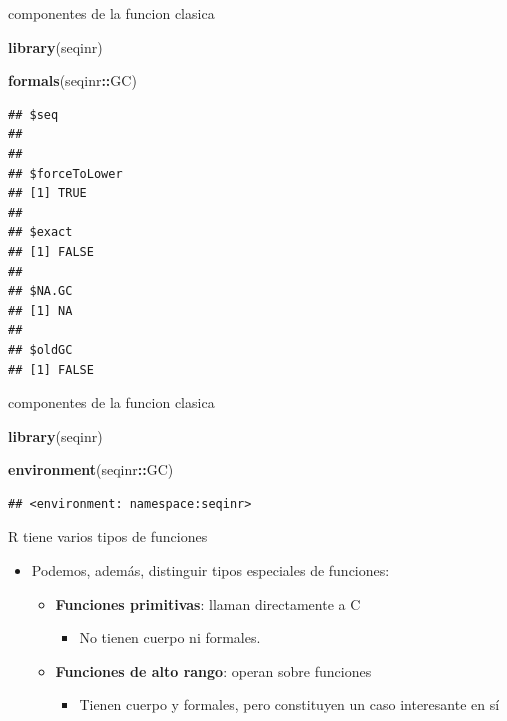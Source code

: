 \documentclass[ignorenonframetext,]{beamer}
\newenvironment{Shaded}{\begin{snugshade}}{\end{snugshade}}
\newcommand{\KeywordTok}[1]{\textcolor[rgb]{0.13,0.29,0.53}{\textbf{#1}}}
\newcommand{\NormalTok}[1]{#1}
\newcommand{\OperatorTok}[1]{\textcolor[rgb]{0.81,0.36,0.00}{\textbf{#1}}}
\providecommand{\tightlist}{%
  \setlength{\itemsep}{0pt}\setlength{\parskip}{0pt}}
\begin{document}
\begin{frame}[fragile]{componentes de la funcion clasica}
\protect\hypertarget{componentes-de-la-funcion-clasica-2}{}

\begin{Shaded}
\begin{Highlighting}[]
\KeywordTok{library}\NormalTok{(seqinr)}

\KeywordTok{formals}\NormalTok{(seqinr}\OperatorTok{::}\NormalTok{GC)}
\end{Highlighting}
\end{Shaded}

\begin{verbatim}
## $seq
## 
## 
## $forceToLower
## [1] TRUE
## 
## $exact
## [1] FALSE
## 
## $NA.GC
## [1] NA
## 
## $oldGC
## [1] FALSE
\end{verbatim}

\end{frame}

\begin{frame}[fragile]{componentes de la funcion clasica}
\protect\hypertarget{componentes-de-la-funcion-clasica-3}{}

\begin{Shaded}
\begin{Highlighting}[]
\KeywordTok{library}\NormalTok{(seqinr)}

\KeywordTok{environment}\NormalTok{(seqinr}\OperatorTok{::}\NormalTok{GC)}
\end{Highlighting}
\end{Shaded}

\begin{verbatim}
## <environment: namespace:seqinr>
\end{verbatim}

\end{frame}

\begin{frame}{R tiene varios tipos de funciones}
\protect\hypertarget{r-tiene-varios-tipos-de-funciones}{}

\begin{itemize}
\tightlist
\item
  Podemos, además, distinguir tipos especiales de funciones:

  \begin{itemize}
  \tightlist
  \item
    \textbf{Funciones primitivas}: llaman directamente a C

    \begin{itemize}
    \tightlist
    \item
      No tienen cuerpo ni formales.
    \end{itemize}
  \item
    \textbf{Funciones de alto rango}: operan sobre funciones

    \begin{itemize}
    \tightlist
    \item
      Tienen cuerpo y formales, pero constituyen un caso interesante en
      sí
    \end{itemize}
  \end{itemize}
\end{itemize}

\end{frame}
\end{document}

